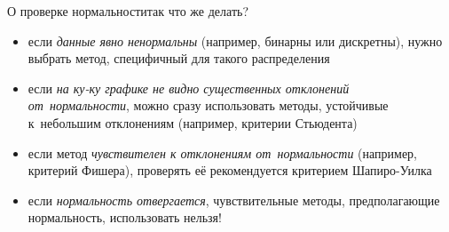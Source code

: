 \documentclass[11pt,pdf,utf8,hyperref={unicode},aspectratio=169]{beamer}
\begin{document}
\begin{frame}{О проверке нормальности}{так что же делать?}

    \large
    \begin{itemize}
        \item если  \textit{данные явно ненормальны} (например, бинарны или дискретны), нужно выбрать метод, специфичный для такого распределения
        \bigskip
        \item если \textit{на ку-ку графике не видно существенных отклонений от~нормальности}, можно сразу использовать методы, устойчивые к~небольшим отклонениям (например, критерии Стьюдента)
        \bigskip
        \item если метод  \textit{чувствителен к отклонениям от~нормальности} (например, критерий Фишера), проверять её рекомендуется критерием Шапиро-Уилка
        \bigskip
        \item если  \textit{нормальность отвергается}, чувствительные методы, предполагающие нормальность, использовать нельзя!
    \end{itemize}
\end{frame}
\end{document}
